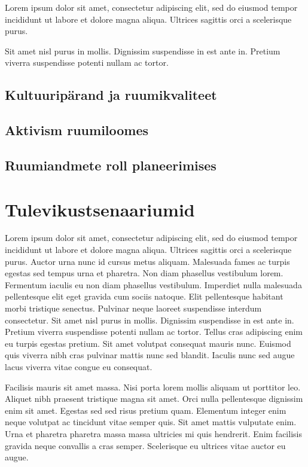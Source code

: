 \documentclass[]{book}
\begin{document}
\begin{blockquote}
Lorem ipsum dolor sit amet, consectetur adipiscing elit, sed do eiusmod
tempor incididunt ut labore et dolore magna aliqua. Ultrices sagittis
orci a scelerisque purus.
\end{blockquote}

Sit amet nisl purus in mollis. Dignissim suspendisse in est ante in. Pretium viverra suspendisse potenti nullam ac tortor.

\hypertarget{chapter42}{%
\section{Kultuuripärand ja ruumikvaliteet}\label{chapter42}}

\hypertarget{chapter43}{%
\section{Aktivism ruumiloomes}\label{chapter43}}

\hypertarget{chapter44}{%
\section{Ruumiandmete roll planeerimises}\label{chapter44}}

\hypertarget{chapter50}{%
\chapter{Tulevikustsenaariumid}\label{chapter50}}

Lorem ipsum dolor sit amet, consectetur adipiscing elit, sed do eiusmod tempor incididunt ut labore et dolore magna aliqua. Ultrices sagittis orci a scelerisque purus. Auctor urna nunc id cursus metus aliquam. Malesuada fames ac turpis egestas sed tempus urna et pharetra. Non diam phasellus vestibulum lorem. Fermentum iaculis eu non diam phasellus vestibulum. Imperdiet nulla malesuada pellentesque elit eget gravida cum sociis natoque. Elit pellentesque habitant morbi tristique senectus. Pulvinar neque laoreet suspendisse interdum consectetur. Sit amet nisl purus in mollis. Dignissim suspendisse in est ante in. Pretium viverra suspendisse potenti nullam ac tortor. Tellus cras adipiscing enim eu turpis egestas pretium. Sit amet volutpat consequat mauris nunc. Euismod quis viverra nibh cras pulvinar mattis nunc sed blandit. Iaculis nunc sed augue lacus viverra vitae congue eu consequat.

Facilisis mauris sit amet massa. Nisi porta lorem mollis aliquam ut porttitor leo. Aliquet nibh praesent tristique magna sit amet. Orci nulla pellentesque dignissim enim sit amet. Egestas sed sed risus pretium quam. Elementum integer enim neque volutpat ac tincidunt vitae semper quis. Sit amet mattis vulputate enim. Urna et pharetra pharetra massa massa ultricies mi quis hendrerit. Enim facilisis gravida neque convallis a cras semper. Scelerisque eu ultrices vitae auctor eu augue.
\end{document}
